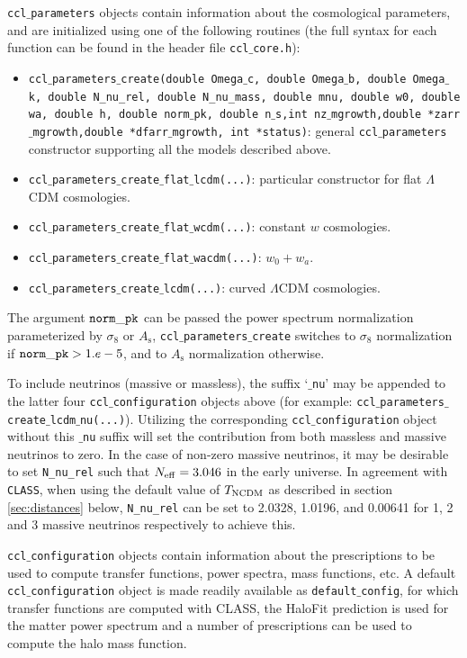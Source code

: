 \documentclass[\docopts]{\docclass}
\begin{document}
{\tt ccl$\_$parameters} objects contain information about the cosmological parameters, and are initialized using one of the following routines (the full syntax for each function can be found in the header file {\tt ccl$\_$core.h}):
\begin{itemize}
 \item {\tt ccl$\_$parameters$\_$create(double Omega$\_$c, double Omega$\_$b, double Omega$\_$k, double N\_nu\_rel, double N\_nu\_mass, double mnu, double w0, double wa, double h, double norm$\_$pk, double n$\_$s,int nz$\_$mgrowth,double *zarr$\_$mgrowth,double *dfarr$\_$mgrowth, int *status)}: general {\tt ccl$\_$parameters} constructor supporting all the models described above.
 \item {\tt ccl$\_$parameters$\_$create$\_$flat$\_$lcdm(...)}: particular constructor for flat $\Lambda$CDM cosmologies.
 \item {\tt ccl$\_$parameters$\_$create$\_$flat$\_$wcdm(...)}: constant $w$ cosmologies.
 \item {\tt ccl$\_$parameters$\_$create$\_$flat$\_$wacdm(...)}: $w_0+w_a$.
 \item {\tt ccl$\_$parameters$\_$create$\_$lcdm(...)}: curved $\Lambda$CDM cosmologies.
\end{itemize}
The argument ${\tt norm\_pk}$ can be passed the power spectrum normalization parameterized by $\sigma_8$ or $A_\mathrm{s}$, {\tt ccl$\_$parameters$\_$create} switches to $\sigma_8$ normalization if ${\tt norm\_pk} > 1.e-5$, and to $A_{\mathrm s}$ normalization otherwise.

To include neutrinos (massive or massless), the suffix `{\tt $\_$nu}' may be appended to the latter four {\tt ccl$\_$configuration} objects above (for example: {\tt ccl$\_$parameters$\_$create$\_$lcdm$\_$nu(...)}). Utilizing the corresponding {\tt ccl$\_$configuration} object without this {\tt $\_$nu} suffix will set the contribution from both massless and massive neutrinos to zero. In the case of non-zero massive neutrinos, it may be desirable to set {\tt N\_nu\_rel} such that $N_{\rm eff}=3.046$ in the early universe. In agreement with {\tt CLASS}, when using the default value of $T_{\rm NCDM}$ as described in section \ref{sec:distances} below, {\tt N\_nu\_rel} can be set to 2.0328, 1.0196, and 0.00641 for 1, 2 and 3 massive neutrinos respectively to achieve this.

{\tt ccl$\_$configuration} objects contain information about the prescriptions to be used to compute transfer functions, power spectra, mass functions, etc. A default {\tt ccl$\_$configuration} object is made readily available as {\tt default$\_$config}, for which transfer functions are computed with CLASS, the HaloFit prediction is used for the matter power spectrum and a number of prescriptions can be used to compute the halo mass function.
\end{document}
